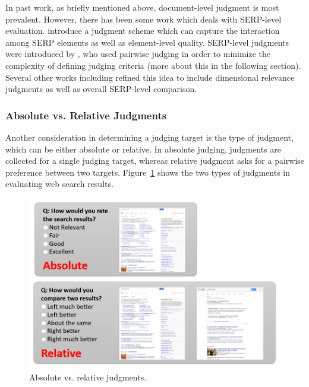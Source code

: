 In past work, as briefly mentioned above, document-level judgment is most prevalent. However, there has been some work which deals with SERP-level evaluation. \cite{Bailey2010} introduce a judgment scheme which can capture the interaction among SERP elements as well as element-level quality. 
%
SERP-level judgments were introduced by \cite{Thomas2006}, who used pairwise judging in order to minimize the complexity of defining judging criteria (more about this in the following section). Several other works including  \cite{Kim:2013} refined this idea to include dimensional relevance judgments as well as overall SERP-level comparison.

\subsubsection{Absolute vs. Relative Judgments}
Another consideration in determining a judging target is the type of judgment, which can be either absolute or relative. In absolute judging, judgments are collected for a single judging target, whereas relative judgment asks for a pairwise preference between two targets. Figure~\ref{fig:judgment_types} shows the two types of judgments in evaluating web search results.

\begin{figure}
	\begin{center}
		\includegraphics[scale=0.5]{images/judgment_types}
		\caption{Absolute vs. relative judgments.} 
		\label{fig:judgment_types}
	\end{center}
\end{figure}

